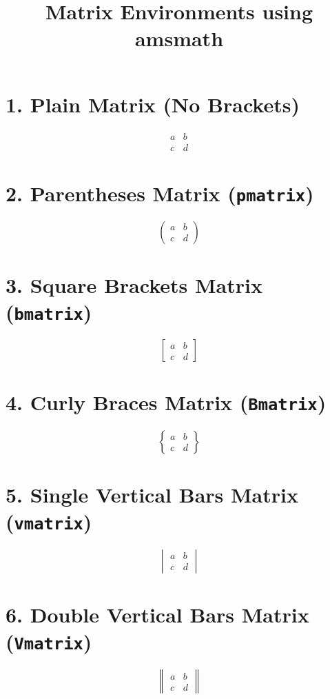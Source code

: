 \documentclass{article}
\title{Matrix Environments using amsmath}
\date{}
\begin{document}
\maketitle

\section*{1. Plain Matrix (No Brackets)}
\[
\begin{matrix}
a & b \\
c & d
\end{matrix}
\]

\section*{2. Parentheses Matrix (\texttt{pmatrix})}
\[
\begin{pmatrix}
a & b \\
c & d
\end{pmatrix}
\]

\section*{3. Square Brackets Matrix (\texttt{bmatrix})}
\[
\begin{bmatrix}
a & b \\
c & d
\end{bmatrix}
\]

\section*{4. Curly Braces Matrix (\texttt{Bmatrix})}
\[
\begin{Bmatrix}
a & b \\
c & d
\end{Bmatrix}
\]

\section*{5. Single Vertical Bars Matrix (\texttt{vmatrix})}
\[
\begin{vmatrix}
a & b \\
c & d
\end{vmatrix}
\]

\section*{6. Double Vertical Bars Matrix (\texttt{Vmatrix})}
\[
\begin{Vmatrix}
a & b \\
c & d
\end{Vmatrix}
\]
\end{document}

